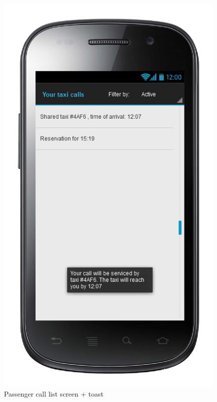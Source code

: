 \begin{figure} [h]
\centering
  	  \includegraphics[scale=0.5]{ui/Passenger call list screen + toast.png}
\caption{Passenger call list screen + toast}
    
\end{figure}

